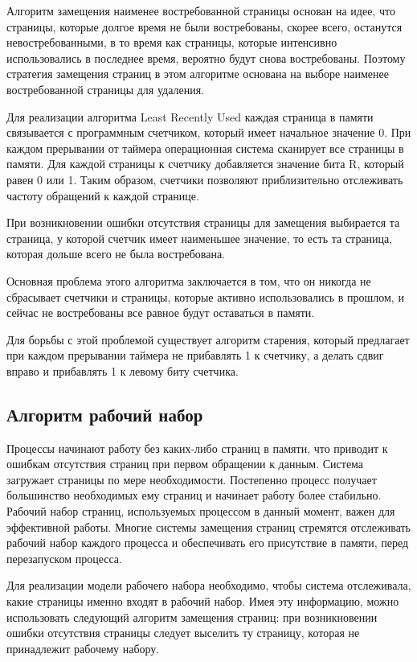 Алгоритм замещения наименее востребованной страницы основан на идее, что страницы, которые долгое время не были востребованы, скорее всего, останутся невостребованными, в то время как страницы, которые интенсивно использовались в последнее время, вероятно будут снова востребованы.
Поэтому стратегия замещения страниц в этом алгоритме основана на выборе наименее востребованной страницы для удаления.

Для реализации алгоритма Least Recently Used каждая страница в памяти связывается с программным счетчиком, который имеет начальное значение 0.
При каждом прерывании от таймера операционная система сканирует все страницы в памяти. 
Для каждой страницы к счетчику добавляется значение бита R,
который равен 0 или 1. 
Таким образом, счетчики позволяют приблизительно отслеживать частоту обращений к каждой странице.

При возникновении ошибки отсутствия страницы для замещения выбирается та страница, у которой счетчик имеет наименьшее значение, то есть та страница, которая дольше всего не была востребована.

Основная проблема этого алгоритма заключается в том, что он никогда не сбрасывает счетчики и страницы, которые активно использовались в прошлом, и сейчас не востребованы все равное будут оставаться в памяти.

Для борьбы с этой проблемой существует алгоритм старения, который предлагает при каждом прерывании таймера не прибавлять 1 к счетчику, а делать сдвиг вправо и прибавлять 1 к левому биту счетчика.

\subsection{Алгоритм рабочий набор}

Процессы начинают работу без каких-либо страниц в памяти,
что приводит к ошибкам отсутствия страниц при первом обращении к данным.
Система загружает страницы по мере необходимости.
Постепенно процесс получает большинство необходимых ему страниц и начинает работу более стабильно.
Рабочий набор страниц, используемых процессом в данный
момент, важен для эффективной работы. 
Многие системы замещения страниц стремятся отслеживать рабочий набор каждого процесса и обеспечивать его присутствие в памяти, перед перезапуском процесса.

Для реализации модели рабочего набора необходимо, чтобы система отслеживала, какие страницы именно входят в рабочий набор.
Имея эту информацию, можно использовать следующий алгоритм замещения страниц: при возникновении ошибки отсутствия страницы следует выселить ту страницу, которая не принадлежит рабочему набору.

